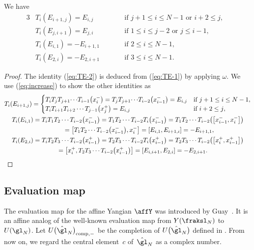 \begin{lem}We have
\begin{alignat}{3}
&T_i(E_{i+1,j})= E_{i,j} \qquad && \text{if $j+1 \leq i \leq N-1$ \ or \ $i+2 \leq j$}, & \label{eq:TE-1}\\
&T_i(E_{j,i+1})= E_{j,i} \qquad &&\text{if $1 \leq i \leq j-2$ \ or \ $j \leq i-1$}, & \label{eq:TE-2}\\
&T_i(E_{i,1})= -E_{i+1,1} \qquad &&\text{if $2 \leq i \leq N-1$}, & \label{eq:TE-3}\\
&T_i(E_{2,i})= -E_{2,i+1} \qquad &&\text{if $3 \leq i \leq N-1$}. & \label{eq:TE-4}
\end{alignat}
\end{lem}
\begin{proof}The identity (\ref{eq:TE-2}) is deduced from (\ref{eq:TE-1}) by applying $\omega$. We use (\ref{eq:increase}) to show the other identities as
\begin{gather*}
T_i(E_{i+1,j}) = \begin{cases}
T_i T_j T_{j+1} {\cdots} T_{i-1}\big(x_i^-\big) = T_j T_{j+1} {\cdots} T_{i-2} \big(x_{i-1}^-\big) = E_{i,j} &\text{if $j+1 \leq i \leq N-1$}, \\
T_i T_{i+1} T_{i+2} \cdots T_{j-1}\big(x_j^+\big) = E_{i,j} & \text{if $i+2 \leq j$},
\end{cases}
\\
T_i(E_{i,1}) = T_i T_{1} T_{2} \cdots T_{i-2}\big(x_{i-1}^-\big) = T_{1} T_{2} \cdots T_{i-2} T_i \big(x_{i-1}^-\big)= T_{1} T_{2} \cdots T_{i-2} \big(\big[x_{i-1}^-,x_i^-\big]\big)\\
\hphantom{T_i(E_{i,1})}{} = \big[T_{1} T_{2} \cdots T_{i-2} \big(x_{i-1}^-\big),x_i^-\big] = [E_{i,1}, E_{i+1,i}] = -E_{i+1,1},\\
T_i(E_{2,i}) = T_i T_{2} T_{3} \cdots T_{i-2}\big(x_{i-1}^+\big) = T_{2} T_{3} \cdots T_{i-2} T_i \big(x_{i-1}^+\big) = T_{2} T_{3} \cdots T_{i-2} \big(\big[x_{i}^+,x_{i-1}^+\big]\big)\\
\hphantom{T_i(E_{2,i})}{} = \big[x_i^+, T_{2} T_{3} \cdots T_{i-2} \big(x_{i-1}^+\big)\big] = [E_{i,i+1}, E_{2,i}] = -E_{2,i+1}.\tag*{\qed}
\end{gather*}\renewcommand{\qed}{}
\end{proof}

\subsection{Evaluation map}

The evaluation map for the affine Yangian $\affY$ was introduced by Guay~\cite{MR2323534}. It is an affine analog of the well-known evaluation map from $Y(\fraksl_N)$ to $U(\gl_N)$. Let $U\big(\hat{\gl}_N\big)_{{\rm comp},-}$ be the completion of ${U}\big(\hat{\gl}_N\big)$ defined in \cite[Definition~2.5]{kodera_evaluation}. From now on, we regard the central element~$c$ of~$\hat{\gl}_N$ as a complex number.

